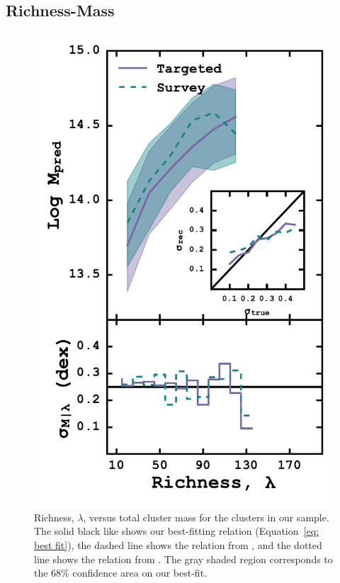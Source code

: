 \subsection{Richness-Mass}
\begin{figure}
	\includegraphics[width=\textwidth]{./figures/massRichness.pdf} 
	\caption{Richness, $\lambda$, versus total cluster mass for the clusters in our sample. The solid
black like shows our best-fitting relation (Equation~\protect\ref{eq: best fit}), the dashed line shows the relation from \protect\cite{Farahi2016}, and the dotted line shows the relation from \protect\cite{Rykoff2012}. The gray shaded region corresponds to the 68\% confidence area on our best-fit.}
\label{fig:massRichness} 
\end{figure}

